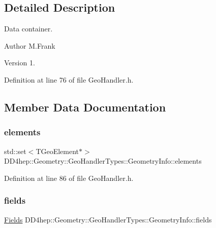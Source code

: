 \subsection{Detailed Description}
Data container. 

\begin{DoxyAuthor}{Author}
M.\+Frank 
\end{DoxyAuthor}
\begin{DoxyVersion}{Version}
1. 
\end{DoxyVersion}


Definition at line 76 of file Geo\+Handler.\+h.



\subsection{Member Data Documentation}
\hypertarget{class_d_d4hep_1_1_geometry_1_1_geo_handler_types_1_1_geometry_info_af3241402a1b5a44a99cebf1f826f8b0f}{}\label{class_d_d4hep_1_1_geometry_1_1_geo_handler_types_1_1_geometry_info_af3241402a1b5a44a99cebf1f826f8b0f} 
\subsubsection{\texorpdfstring{elements}{elements}}
{\footnotesize\ttfamily std\+::set$<$T\+Geo\+Element$\ast$$>$ D\+D4hep\+::\+Geometry\+::\+Geo\+Handler\+Types\+::\+Geometry\+Info\+::elements}



Definition at line 86 of file Geo\+Handler.\+h.

\hypertarget{class_d_d4hep_1_1_geometry_1_1_geo_handler_types_1_1_geometry_info_a5865cf29de9b97cec253fdc6295d3ece}{}\label{class_d_d4hep_1_1_geometry_1_1_geo_handler_types_1_1_geometry_info_a5865cf29de9b97cec253fdc6295d3ece} 
\subsubsection{\texorpdfstring{fields}{fields}}
{\footnotesize\ttfamily \hyperlink{class_d_d4hep_1_1_geometry_1_1_geo_handler_types_ac82df292e19cfb74015cb798e54620b4}{Fields} D\+D4hep\+::\+Geometry\+::\+Geo\+Handler\+Types\+::\+Geometry\+Info\+::fields}




